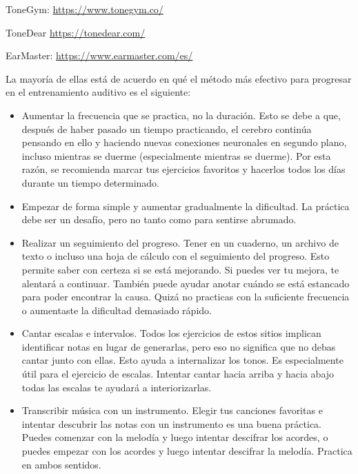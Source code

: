 \documentclass[12pt,twoside,titlepage]{report}
\begin{document}
ToneGym: \url{https://www.tonegym.co/}

ToneDear \url{https://tonedear.com/}

EarMaster: \url{https://www.earmaster.com/es/}

La mayoría de ellas está de acuerdo en qué el método más efectivo para progresar en el entrenamiento auditivo es el siguiente:

\begin{itemize}
    \item Aumentar la frecuencia que se practica, no la duración. Esto se debe a que, después de haber pasado un tiempo practicando, el cerebro continúa pensando en ello y haciendo nuevas conexiones neuronales en segundo plano, incluso mientras se duerme (especialmente mientras se duerme). Por esta razón, se recomienda marcar tus ejercicios favoritos y hacerlos todos los días durante un tiempo determinado.
    
    \item Empezar de forma simple y aumentar gradualmente la dificultad. La práctica debe ser un desafío, pero no tanto como para sentirse abrumado.
    
    \item Realizar un seguimiento del progreso. Tener en un cuaderno, un archivo de texto o incluso una hoja de cálculo con el seguimiento del progreso. Esto permite saber con certeza si se está mejorando. Si puedes ver tu mejora, te alentará a continuar. También puede ayudar anotar cuándo se está estancado para poder encontrar la causa. Quizá no practicas con la suficiente frecuencia o aumentaste la dificultad demasiado rápido.
    
    \item Cantar escalas e intervalos. Todos los ejercicios de estos sitios implican identificar notas en lugar de generarlas, pero eso no significa que no debas cantar junto con ellas. Esto ayuda a internalizar los tonos. Es especialmente útil para el ejercicio de escalas. Intentar cantar hacia arriba y hacia abajo todas las escalas te ayudará a interiorizarlas.
    
    \item Transcribir música con un instrumento. Elegir tus canciones favoritas e intentar descubrir las notas con un instrumento es una buena práctica. Puedes comenzar con la melodía y luego intentar descifrar los acordes, o puedes empezar con los acordes y luego intentar descifrar la melodía. Practica en ambos sentidos.
\end{itemize}
\end{document}
